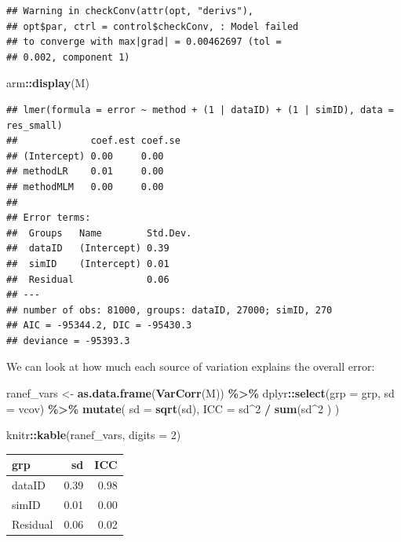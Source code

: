 \documentclass[
]{book}
\newenvironment{Shaded}{\begin{snugshade}}{\end{snugshade}}
\newcommand{\AttributeTok}[1]{\textcolor[rgb]{0.13,0.29,0.53}{#1}}
\newcommand{\DecValTok}[1]{\textcolor[rgb]{0.00,0.00,0.81}{#1}}
\newcommand{\FunctionTok}[1]{\textcolor[rgb]{0.13,0.29,0.53}{\textbf{#1}}}
\newcommand{\NormalTok}[1]{#1}
\newcommand{\OtherTok}[1]{\textcolor[rgb]{0.56,0.35,0.01}{#1}}
\newcommand{\SpecialCharTok}[1]{\textcolor[rgb]{0.81,0.36,0.00}{\textbf{#1}}}
\begin{document}
\begin{verbatim}
## Warning in checkConv(attr(opt, "derivs"),
## opt$par, ctrl = control$checkConv, : Model failed
## to converge with max|grad| = 0.00462697 (tol =
## 0.002, component 1)
\end{verbatim}

\begin{Shaded}
\begin{Highlighting}[]
\NormalTok{arm}\SpecialCharTok{::}\FunctionTok{display}\NormalTok{(M)}
\end{Highlighting}
\end{Shaded}

\begin{verbatim}
## lmer(formula = error ~ method + (1 | dataID) + (1 | simID), data = res_small)
##             coef.est coef.se
## (Intercept) 0.00     0.00   
## methodLR    0.01     0.00   
## methodMLM   0.00     0.00   
## 
## Error terms:
##  Groups   Name        Std.Dev.
##  dataID   (Intercept) 0.39    
##  simID    (Intercept) 0.01    
##  Residual             0.06    
## ---
## number of obs: 81000, groups: dataID, 27000; simID, 270
## AIC = -95344.2, DIC = -95430.3
## deviance = -95393.3
\end{verbatim}

We can look at how much each source of variation explains the overall error:

\begin{Shaded}
\begin{Highlighting}[]
\NormalTok{ranef\_vars }\OtherTok{\textless{}{-}}
  \FunctionTok{as.data.frame}\NormalTok{(}\FunctionTok{VarCorr}\NormalTok{(M)) }\SpecialCharTok{\%\textgreater{}\%}
\NormalTok{  dplyr}\SpecialCharTok{::}\FunctionTok{select}\NormalTok{(}\AttributeTok{grp =}\NormalTok{ grp, }\AttributeTok{sd =}\NormalTok{ vcov) }\SpecialCharTok{\%\textgreater{}\%}
  \FunctionTok{mutate}\NormalTok{( }\AttributeTok{sd =} \FunctionTok{sqrt}\NormalTok{(sd),}
          \AttributeTok{ICC =}\NormalTok{ sd}\SpecialCharTok{\^{}}\DecValTok{2} \SpecialCharTok{/} \FunctionTok{sum}\NormalTok{(sd}\SpecialCharTok{\^{}}\DecValTok{2}\NormalTok{ ) )}

\NormalTok{knitr}\SpecialCharTok{::}\FunctionTok{kable}\NormalTok{(ranef\_vars, }\AttributeTok{digits =} \DecValTok{2}\NormalTok{)}
\end{Highlighting}
\end{Shaded}

\begin{tabular}{l|r|r}
\hline
grp & sd & ICC\\
\hline
dataID & 0.39 & 0.98\\
\hline
simID & 0.01 & 0.00\\
\hline
Residual & 0.06 & 0.02\\
\hline
\end{tabular}
\end{document}

